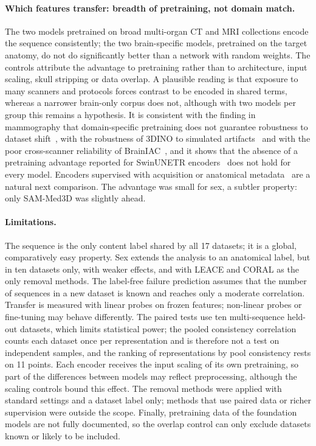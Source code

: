 \documentclass[11pt]{article}
\begin{document}
\paragraph{Which features transfer: breadth of pretraining, not domain match.}
The two models pretrained on broad multi-organ CT and MRI collections encode
the sequence consistently; the two brain-specific models, pretrained on the
target anatomy, do not do significantly better than a network with random
weights. The controls attribute the advantage to pretraining rather than to
architecture, input scaling, skull stripping or data overlap. A plausible
reading is that exposure to many scanners and protocols forces contrast to be
encoded in shared terms, whereas a narrower brain-only corpus does not,
although with two models per group this remains a hypothesis. It is
consistent with the finding in mammography that domain-specific pretraining
does not guarantee robustness to dataset shift~\cite{nguyen_benchmarking_2026},
with the robustness of 3DINO to simulated
artifacts~\cite{mielcarz_3d_2026} and with the poor cross-scanner reliability
of BrainIAC~\cite{navarro-gonzalez_cross-scanner_2026}, and it shows that the
absence of a pretraining advantage reported for SwinUNETR
encoders~\cite{rahbar_frozen_2026} does not hold for every model. Encoders
supervised with acquisition or anatomical
metadata~\cite{navarro-gonzalez_cross-scanner_2026, avci_metadata_2026} are a
natural next comparison. The advantage was small for sex, a subtler
property: only SAM-Med3D was slightly ahead.

\paragraph{Limitations.}
The sequence is the only content label shared by all 17 datasets; it is a
global, comparatively easy property. Sex extends the analysis to an
anatomical label, but in ten datasets only, with weaker effects, and with
LEACE and CORAL as the only removal methods. The label-free failure
prediction assumes that the number of sequences in a new dataset is known and
reaches only a moderate correlation. Transfer is measured with linear
probes on frozen features; non-linear probes or fine-tuning may behave
differently. The paired tests use ten multi-sequence held-out datasets, which
limits statistical power; the pooled consistency correlation counts each
dataset once per representation and is therefore not a test on independent
samples, and the ranking of representations by pool consistency rests on 11
points. Each encoder receives the input scaling of its own
pretraining, so part of the differences between models may reflect
preprocessing, although the scaling controls bound this effect. The removal
methods were applied with standard settings and a dataset label only; methods
that use paired data or richer supervision were outside the scope. Finally,
pretraining data of the foundation models are not fully documented, so the
overlap control can only exclude datasets known or likely to be included.
\end{document}
